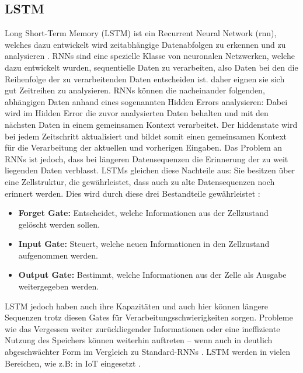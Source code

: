 \documentclass[a4paper,12pt]{article}
\begin{document}
	\subsection{LSTM}
	Long Short-Term Memory (LSTM) ist ein Recurrent Neural Network (\gls{rnn}), welches dazu entwickelt wird zeitabhängige Datenabfolgen zu erkennen und zu analysieren \cite{staudemeyer2019understanding}.
	RNNs sind eine spezielle Klasse von neuronalen Netzwerken, welche dazu entwickelt wurden, sequentielle Daten zu verarbeiten, also Daten bei den die Reihenfolge der zu verarbeitenden Daten entscheiden ist. daher eignen sie sich gut Zeitreihen zu analysieren. RNNs können die nacheinander folgenden, abhängigen Daten anhand eines sogenannten Hidden Errors analysieren: Dabei wird im Hidden Error die zuvor analysierten Daten behalten und mit den nächsten Daten in einem gemeinsamen Kontext verarbeitet. Der \gls{hiddenstate} wird bei jedem Zeitschritt aktualisiert und bildet somit einen gemeinsamen Kontext für die Verarbeitung der aktuellen und vorherigen Eingaben.
	Das Problem an RNNs ist jedoch, dass bei längeren Datensequenzen die Erinnerung der zu weit liegenden Daten verblasst.
	LSTMs gleichen diese Nachteile aus: Sie besitzen über eine Zellstruktur, die gewährleistet, dass auch zu alte Datensequenzen noch erinnert werden.
	Dies wird durch diese drei Bestandteile gewährleistet \cite{hochreiter1997long}:
	\begin{itemize}
		\item \textbf{Forget Gate:} Entscheidet, welche Informationen aus der Zellzustand gelöscht werden sollen.
		\item \textbf{Input Gate:}  Steuert, welche neuen Informationen in den Zellzustand aufgenommen werden.
		\item \textbf{Output Gate:} Bestimmt, welche Informationen aus der Zelle als Ausgabe weitergegeben werden.
	\end{itemize}
	LSTM jedoch haben auch ihre Kapazitäten und auch hier können längere Sequenzen trotz diesen Gates für Verarbeitungsschwierigkeiten sorgen.
	Probleme wie das Vergessen weiter zurückliegender Informationen oder eine ineffiziente Nutzung des Speichers können weiterhin auftreten – wenn auch in deutlich abgeschwächter Form im Vergleich zu Standard-RNNs \cite{hochreiter1997long}.
	LSTM werden in vielen Bereichen, wie z.B: in IoT eingesetzt \cite{wei2022lstm}.
	
\end{document}
